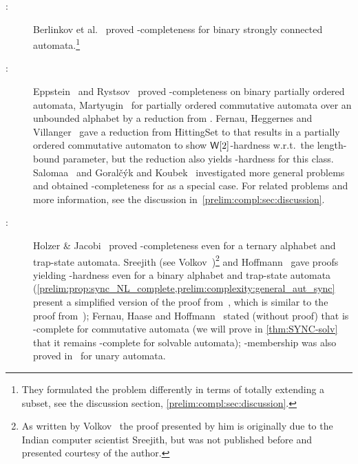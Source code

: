\begin{description}
	\item[\SIS:] \label{prelim:classes:intro:SFS} Berlinkov et al.~\cite[Thm.~3~\&~4]{BerlinkovFS21}
	proved \PSPACE-completeness for binary strongly connected automata.\footnote{They formulated the problem
		differently in terms of totally extending a subset,
		see the discussion section, \cref{prelim:compl:sec:discussion}.}
	
	\item[\DFASWS:] \label{prelim:classes:intro:DFASWS} Eppstein~\cite[Thm.~8]{Eppstein90} and Rystsov~\cite{Rys80} proved
	\NP-completeness on binary partially ordered automata, Martyugin~\cite[Prop.~5.3]{Mar2009b} for partially ordered commutative automata over an unbounded alphabet
	by a reduction from \SAT.	
	Fernau, Heggernes and Villanger~\cite[Thm.~3]{DBLP:journals/jcss/FernauHV15}
	gave a reduction from {\sc HittingSet} to \DFASS
	that results in a partially ordered commutative automaton
	to show $\textup{\textsf{W}}[2]$-hardness w.r.t.~the length-bound parameter,
	but the reduction also yields \NP-hardness for this class.
	Salomaa~\cite{DBLP:journals/tcs/Salomaa03} and Goral\v{c}\'yk and Koubek~\cite{GorKou95}
	investigated more general problems and obtained \NP-completeness for \DFASWS as a special case.
	For related problems and more information, see the discussion in~\cref{prelim:compl:sec:discussion}.		
		
	\item[\DFAS:] \label{prelim:classes:intro:SYNC} Holzer \& Jacobi~\cite[Lem.~14]{HolzerJ18}
	proved \NL-completeness
	even for a ternary alphabet and trap-state automata. Sreejith (see Volkov~\cite[Prop.~2.2]{Volkov22})\footnote{As written
		by Volkov~\cite{Volkov22} the proof
		presented by him is originally due to the Indian computer scientist Sreejith, but
		was not published before and presented courtesy of the author.}
	and Hoffmann~\cite[Thm.~5]{DBLP:journals/tcs/Hoffmann21}
	gave proofs yielding \NL-hardness even for a binary alphabet and trap-state automata (\cref{prelim:prop:sync_NL_complete,prelim:complexity:general_aut_sync}
	present a simplified version of the proof from~\cite[Thm.~5]{DBLP:journals/tcs/Hoffmann21}, 
	which is similar to the proof from~\cite[Prop.~2.2]{Volkov22});
	Fernau, Haase and Hoffmann~\cite[Thm.~5.4]{DBLP:conf/fun/FernauH022}
	stated (without proof) that \DFAS is \LOGSPACE-complete for commutative automata (we will prove in \cref{thm:SYNC-solv} 
	that it remains \LOGSPACE-complete for solvable automata); \LOGSPACE-membership was also proved in~\cite[Thm.~5]{DBLP:journals/tcs/Hoffmann21}
	for unary automata.
\end{description}


